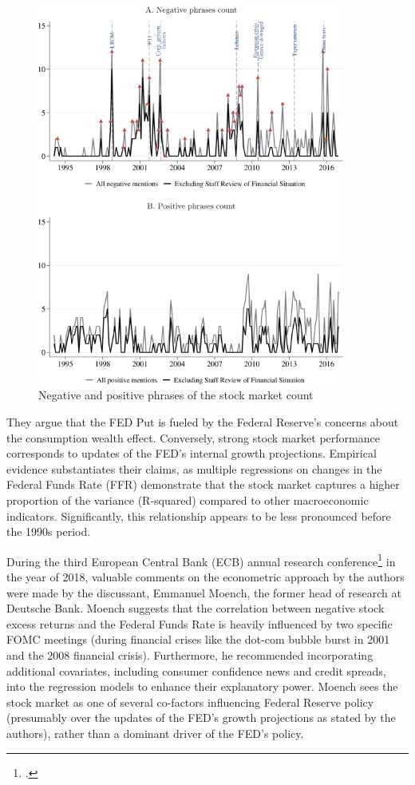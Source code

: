 \begin{figure}[h]
    \centering
        \label{cies21_fig5}
    \includegraphics[width=0.9\textwidth]{figures/cies21/Figure5}
    \caption{Negative and positive phrases of the stock market count \parencite{cieslak_economics_2021}}
\end{figure}

They argue that the FED Put is fueled by the Federal Reserve's concerns about the consumption wealth effect. Conversely, strong stock market performance corresponds to updates of the FED’s internal growth projections. Empirical evidence substantiates their claims, as multiple regressions on changes in the Federal Funds Rate (FFR) demonstrate that the stock market captures a higher proportion of the variance (R-squared) compared to other macroeconomic indicators. Significantly, this relationship appears to be less pronounced before the 1990s period.  

During the third European Central Bank (ECB) annual research conference\footcite{european_central_bank_third_2018} in the year of 2018, valuable comments on the econometric approach by the authors were made by the discussant, Emmanuel Moench, the former head of research at Deutsche Bank. Moench suggests that the correlation between negative stock excess returns and the Federal Funds Rate is heavily influenced by two specific FOMC meetings (during financial crises like the dot-com bubble burst in 2001 and the 2008 financial crisis). Furthermore, he recommended incorporating additional covariates, including consumer confidence news and credit spreads, into the regression models to enhance their explanatory power. Moench sees the stock market as one of several co-factors influencing Federal Reserve policy (presumably over the updates of the FED's growth projections as stated by the authors), rather than a dominant driver of the FED's policy.

